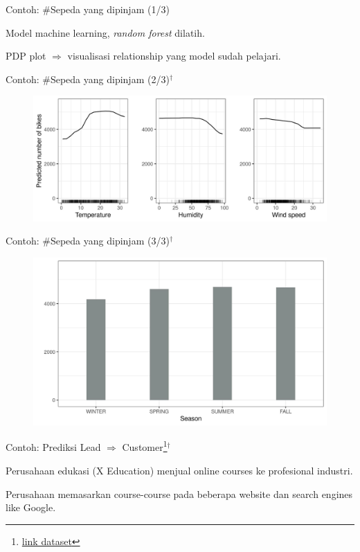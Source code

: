 \documentclass[aspectratio=169]{beamer}
\begin{document}
\begin{frame}{Contoh: \#Sepeda yang dipinjam (1/3)}
	\begin{vfilleditems}
		\item Model machine learning, \textit{random forest} dilatih.
		\item PDP plot $\Rightarrow$ visualisasi relationship yang model sudah pelajari.
	\end{vfilleditems}
\end{frame}

\begin{frame}{Contoh: \#Sepeda yang dipinjam (2/3)$^\dagger$}
	\begin{figure}[!ht]
		\centering
		\includegraphics[scale=.75]{images/pdp-bike-1}
	\end{figure}
\end{frame}

\begin{frame}{Contoh: \#Sepeda yang dipinjam (3/3)$^\dagger$}
	\begin{figure}[!ht]
		\centering
		\includegraphics[scale=.6]{images/pdp-bike-cat-1}
	\end{figure}
\end{frame}

\begin{frame}{Contoh: Prediksi Lead  $\Rightarrow$ Customer\footnote{\href{https://www.kaggle.com/datasets/lakshmikalyan/lead-scoring-x-online-education}{link dataset} }$^\dagger$}
	\begin{vfilleditems}
		\item Perusahaan edukasi (X Education) menjual online courses ke profesional industri.
		\item Perusahaan memasarkan course-course pada beberapa website dan search engines like Google.
	\end{vfilleditems}
\end{frame}
\end{document}
